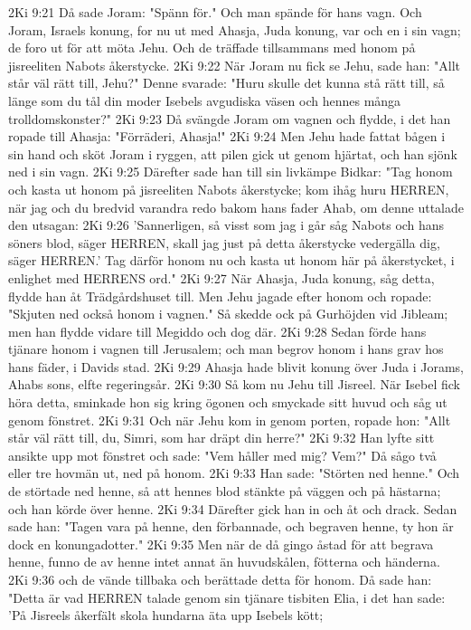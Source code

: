 2Ki 9:21  Då sade Joram: "Spänn för." Och man spände för hans vagn. Och Joram, Israels konung, for nu ut med Ahasja, Juda konung, var och en i sin vagn; de foro ut för att möta Jehu. Och de träffade tillsammans med honom på jisreeliten Nabots åkerstycke.
2Ki 9:22  När Joram nu fick se Jehu, sade han: "Allt står väl rätt till, Jehu?" Denne svarade: "Huru skulle det kunna stå rätt till, så länge som du tål din moder Isebels avgudiska väsen och hennes många trolldomskonster?"
2Ki 9:23  Då svängde Joram om vagnen och flydde, i det han ropade till Ahasja: "Förräderi, Ahasja!"
2Ki 9:24  Men Jehu hade fattat bågen i sin hand och sköt Joram i ryggen, att pilen gick ut genom hjärtat, och han sjönk ned i sin vagn.
2Ki 9:25  Därefter sade han till sin livkämpe Bidkar: "Tag honom och kasta ut honom på jisreeliten Nabots åkerstycke; kom ihåg huru HERREN, när jag och du bredvid varandra redo bakom hans fader Ahab, om denne uttalade den utsagan:
2Ki 9:26  'Sannerligen, så visst som jag i går såg Nabots och hans söners blod, säger HERREN, skall jag just på detta åkerstycke vedergälla dig, säger HERREN.' Tag därför honom nu och kasta ut honom här på åkerstycket, i enlighet med HERRENS ord."
2Ki 9:27  När Ahasja, Juda konung, såg detta, flydde han åt Trädgårdshuset till. Men Jehu jagade efter honom och ropade: "Skjuten ned också honom i vagnen." Så skedde ock på Gurhöjden vid Jibleam; men han flydde vidare till Megiddo och dog där.
2Ki 9:28  Sedan förde hans tjänare honom i vagnen till Jerusalem; och man begrov honom i hans grav hos hans fäder, i Davids stad.
2Ki 9:29  Ahasja hade blivit konung över Juda i Jorams, Ahabs sons, elfte regeringsår.
2Ki 9:30  Så kom nu Jehu till Jisreel. När Isebel fick höra detta, sminkade hon sig kring ögonen och smyckade sitt huvud och såg ut genom fönstret.
2Ki 9:31  Och när Jehu kom in genom porten, ropade hon: "Allt står väl rätt till, du, Simri, som har dräpt din herre?"
2Ki 9:32  Han lyfte sitt ansikte upp mot fönstret och sade: "Vem håller med mig? Vem?" Då sågo två eller tre hovmän ut, ned på honom.
2Ki 9:33  Han sade: "Störten ned henne." Och de störtade ned henne, så att hennes blod stänkte på väggen och på hästarna; och han körde över henne.
2Ki 9:34  Därefter gick han in och åt och drack. Sedan sade han: "Tagen vara på henne, den förbannade, och begraven henne, ty hon är dock en konungadotter."
2Ki 9:35  Men när de då gingo åstad för att begrava henne, funno de av henne intet annat än huvudskålen, fötterna och händerna.
2Ki 9:36  och de vände tillbaka och berättade detta för honom. Då sade han: "Detta är vad HERREN talade genom sin tjänare tisbiten Elia, i det han sade: 'På Jisreels åkerfält skola hundarna äta upp Isebels kött;
